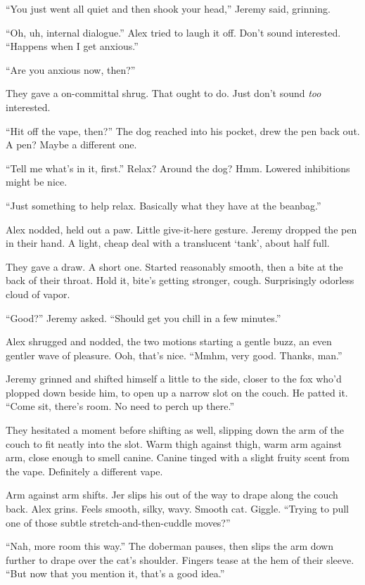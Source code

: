``You just went all quiet and then shook your head,'' Jeremy said, grinning.

``Oh, uh, internal dialogue.'' Alex tried to laugh it off. Don't sound interested. ``Happens when I get anxious.''

``Are you anxious now, then?''

They gave a on-committal shrug. That ought to do. Just don't sound \emph{too} interested.

``Hit off the vape, then?'' The dog reached into his pocket, drew the pen back out. A pen? Maybe a different one.

``Tell me what's in it, first.'' Relax? Around the dog? Hmm. Lowered inhibitions might be nice.

``Just something to help relax. Basically what they have at the beanbag.''

Alex nodded, held out a paw. Little give-it-here gesture. Jeremy dropped the pen in their hand. A light, cheap deal with a translucent `tank', about half full.

They gave a draw. A short one. Started reasonably smooth, then a bite at the back of their throat. Hold it, bite's getting stronger, cough. Surprisingly odorless cloud of vapor.

``Good?'' Jeremy asked. ``Should get you chill in a few minutes.''

Alex shrugged and nodded, the two motions starting a gentle buzz, an even gentler wave of pleasure. Ooh, that's nice. ``Mmhm, very good. Thanks, man.''

Jeremy grinned and shifted himself a little to the side, closer to the fox who'd plopped down beside him, to open up a narrow slot on the couch. He patted it. ``Come sit, there's room. No need to perch up there.''

They hesitated a moment before shifting as well, slipping down the arm of the couch to fit neatly into the slot. Warm thigh against thigh, warm arm against arm, close enough to smell canine. Canine tinged with a slight fruity scent from the vape. Definitely a different vape.

Arm against arm shifts. Jer slips his out of the way to drape along the couch back. Alex grins. Feels smooth, silky, wavy. Smooth cat. Giggle. ``Trying to pull one of those subtle stretch-and-then-cuddle moves?''

``Nah, more room this way.'' The doberman pauses, then slips the arm down further to drape over the cat's shoulder. Fingers tease at the hem of their sleeve. ``But now that you mention it, that's a good idea.''

